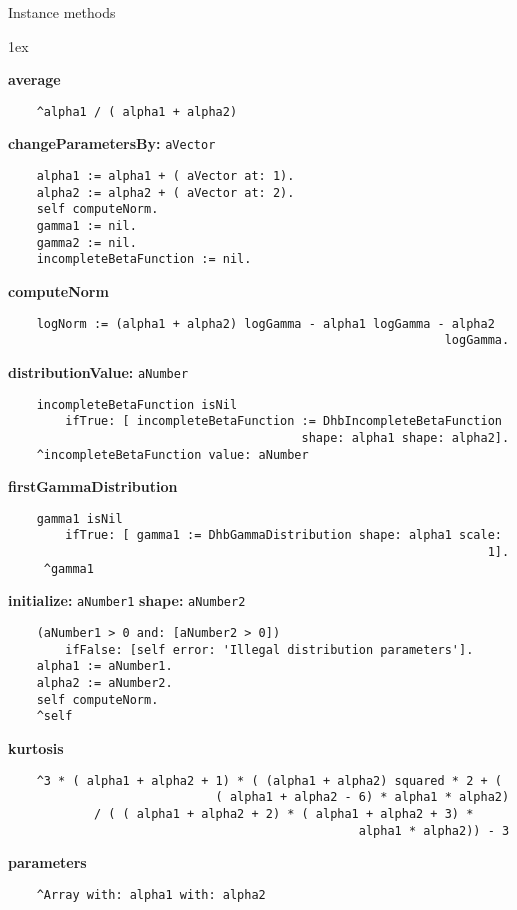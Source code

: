 Instance methods
{\parskip 1ex\par\noindent}
{\bf average}
\begin{verbatim}
    ^alpha1 / ( alpha1 + alpha2)

\end{verbatim}
{\bf changeParametersBy:} {\tt aVector}
\begin{verbatim}
    alpha1 := alpha1 + ( aVector at: 1).
    alpha2 := alpha2 + ( aVector at: 2).
    self computeNorm.
    gamma1 := nil.
    gamma2 := nil.
    incompleteBetaFunction := nil.

\end{verbatim}
{\bf computeNorm}
\begin{verbatim}
    logNorm := (alpha1 + alpha2) logGamma - alpha1 logGamma - alpha2 
                                                             logGamma.

\end{verbatim}
{\bf distributionValue:} {\tt aNumber}
\begin{verbatim}
    incompleteBetaFunction isNil
        ifTrue: [ incompleteBetaFunction := DhbIncompleteBetaFunction 
                                         shape: alpha1 shape: alpha2].
    ^incompleteBetaFunction value: aNumber

\end{verbatim}
{\bf firstGammaDistribution}
\begin{verbatim}
    gamma1 isNil
        ifTrue: [ gamma1 := DhbGammaDistribution shape: alpha1 scale: 
                                                                   1].
     ^gamma1

\end{verbatim}
{\bf initialize:} {\tt aNumber1} {\bf shape:} {\tt aNumber2}
\begin{verbatim}
    (aNumber1 > 0 and: [aNumber2 > 0]) 
        ifFalse: [self error: 'Illegal distribution parameters'].
    alpha1 := aNumber1.
    alpha2 := aNumber2.
    self computeNorm.
    ^self

\end{verbatim}
{\bf kurtosis}
\begin{verbatim}
    ^3 * ( alpha1 + alpha2 + 1) * ( (alpha1 + alpha2) squared * 2 + ( 
                             ( alpha1 + alpha2 - 6) * alpha1 * alpha2)
            / ( ( alpha1 + alpha2 + 2) * ( alpha1 + alpha2 + 3) * 
                                                 alpha1 * alpha2)) - 3

\end{verbatim}
{\bf parameters}
\begin{verbatim}
    ^Array with: alpha1 with: alpha2

\end{verbatim}
